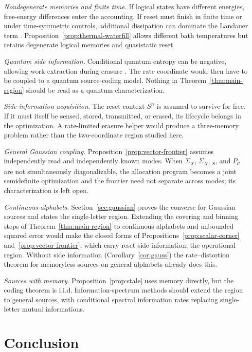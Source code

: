 \documentclass[letterpaper,onecolumn]{IEEEtran}
\theoremstyle{definition}
\theoremstyle{remark}
\newcommand{\PC}{P_{\mathcal{C}}}
\newcommand{\1}{\mathbf{1}}
\begin{document}
\emph{Nondegenerate memories and finite time.} If logical states have different
energies, free-energy differences enter the accounting. If reset must finish in
finite time or under time-symmetric controls, additional dissipation can dominate
the Landauer term \cite{reeb2014}. Proposition~\ref{prop:thermal-waterfill}
allows different bath temperatures but retains degenerate logical memories and
quasistatic reset.

\emph{Quantum side information.} Conditional quantum entropy can be negative,
allowing work extraction during erasure \cite{delrio2011}. The rate coordinate
would then have to be coupled to a quantum source-coding model. Nothing in
Theorem~\ref{thm:main-region} should be read as a quantum characterization.

\emph{Side information acquisition.} The reset context $S^n$ is assumed to
survive for free. If it must itself be sensed, stored, transmitted, or erased,
its lifecycle belongs in the optimization. A rate-limited erasure helper would
produce a three-memory problem rather than the two-coordinate region studied
here.

\emph{General Gaussian coupling.} Proposition~\ref{prop:vector-frontier}
assumes independently read and independently known modes. When $\Sigma_X$,
$\Sigma_{X\mid S}$, and $\PC$ are not simultaneously diagonalizable, the
allocation program becomes a joint semidefinite optimization and the frontier
need not separate across modes; its characterization is left open.

\emph{Continuous alphabets.} Section~\ref{sec:gaussian} proves the converse
for Gaussian sources and states the single-letter region. Extending the
covering and binning steps of Theorem~\ref{thm:main-region} to continuous
alphabets and unbounded squared error would make the closed forms of
Propositions~\ref{prop:scalar-corner} and~\ref{prop:vector-frontier}, which
carry reset side information, the operational region. Without side
information (Corollary~\ref{cor:gauss}) the rate--distortion theorem for
memoryless sources on general alphabets \cite[Thm.~24.2]{polyanskiywu2016}
already does this.

\emph{Sources with memory.} Proposition~\ref{prop:stale} uses memory directly,
but the coding theorem is i.i.d. Information-spectrum methods should extend the
region to general sources, with conditional spectral information rates replacing
single-letter mutual informations.

\section{Conclusion}\label{sec:conclusion}
\end{document}
